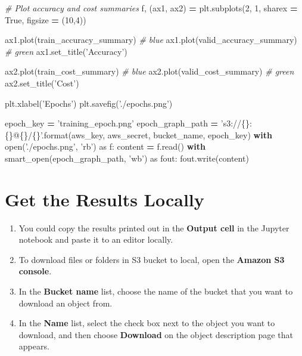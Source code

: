 \documentclass[]{book}
\newenvironment{Shaded}{\begin{snugshade}}{\end{snugshade}}
\newcommand{\DecValTok}[1]{\textcolor[rgb]{0.00,0.00,0.81}{#1}}
\newcommand{\SpecialCharTok}[1]{\textcolor[rgb]{0.00,0.00,0.00}{#1}}
\newcommand{\StringTok}[1]{\textcolor[rgb]{0.31,0.60,0.02}{#1}}
\newcommand{\ImportTok}[1]{#1}
\newcommand{\CommentTok}[1]{\textcolor[rgb]{0.56,0.35,0.01}{\textit{#1}}}
\newcommand{\VariableTok}[1]{\textcolor[rgb]{0.00,0.00,0.00}{#1}}
\newcommand{\ControlFlowTok}[1]{\textcolor[rgb]{0.13,0.29,0.53}{\textbf{#1}}}
\newcommand{\OperatorTok}[1]{\textcolor[rgb]{0.81,0.36,0.00}{\textbf{#1}}}
\newcommand{\BuiltInTok}[1]{#1}
\newcommand{\NormalTok}[1]{#1}
\providecommand{\tightlist}{%
  \setlength{\itemsep}{0pt}\setlength{\parskip}{0pt}}
\begin{document}
\begin{Shaded}
\begin{Highlighting}[]
\CommentTok{# Plot accuracy and cost summaries}
\NormalTok{f, (ax1, ax2) }\OperatorTok{=}\NormalTok{ plt.subplots(}\DecValTok{2}\NormalTok{, }\DecValTok{1}\NormalTok{, sharex }\OperatorTok{=} \VariableTok{True}\NormalTok{, figsize }\OperatorTok{=}\NormalTok{ (}\DecValTok{10}\NormalTok{,}\DecValTok{4}\NormalTok{))}

\NormalTok{ax1.plot(train_accuracy_summary) }\CommentTok{# blue}
\NormalTok{ax1.plot(valid_accuracy_summary) }\CommentTok{# green}
\NormalTok{ax1.set_title(}\StringTok{'Accuracy'}\NormalTok{)}

\NormalTok{ax2.plot(train_cost_summary) }\CommentTok{# blue}
\NormalTok{ax2.plot(valid_cost_summary) }\CommentTok{# green}
\NormalTok{ax2.set_title(}\StringTok{'Cost'}\NormalTok{)}

\NormalTok{plt.xlabel(}\StringTok{'Epochs'}\NormalTok{)}
\NormalTok{plt.savefig(}\StringTok{'./epochs.png'}\NormalTok{)}

\NormalTok{epoch_key }\OperatorTok{=} \StringTok{'training_epoch.png'}
\NormalTok{epoch_graph_path }\OperatorTok{=} \StringTok{'s3://}\SpecialCharTok{\{\}}\StringTok{:}\SpecialCharTok{\{\}}\StringTok{@}\SpecialCharTok{\{\}}\StringTok{/}\SpecialCharTok{\{\}}\StringTok{'}\NormalTok{.}\BuiltInTok{format}\NormalTok{(aws_key, aws_secret, bucket_name, epoch_key)}
\ControlFlowTok{with} \BuiltInTok{open}\NormalTok{(}\StringTok{'./epochs.png'}\NormalTok{, }\StringTok{'rb'}\NormalTok{) }\ImportTok{as}\NormalTok{ f:}
\NormalTok{    content }\OperatorTok{=}\NormalTok{ f.read()}
\ControlFlowTok{with}\NormalTok{ smart_open(epoch_graph_path, }\StringTok{'wb'}\NormalTok{) }\ImportTok{as}\NormalTok{ fout:}
\NormalTok{    fout.write(content)}
\end{Highlighting}
\end{Shaded}

\hypertarget{get-the-results-locally}{%
\chapter{Get the Results Locally}\label{get-the-results-locally}}

\begin{enumerate}
\def\labelenumi{\arabic{enumi}.}
\setcounter{enumi}{111}
\tightlist
\item
  You could copy the results printed out in the \textbf{Output cell} in the Jupyter notebook and paste it to an editor locally.
\item
  To download files or folders in S3 bucket to local, open the \textbf{Amazon S3 console}.
\item
  In the \textbf{Bucket name} list, choose the name of the bucket that you want to download an object from.
\item
  In the \textbf{Name} list, select the check box next to the object you want to download, and then choose \textbf{Download} on the object description page that appears.
\end{enumerate}
\end{document}
